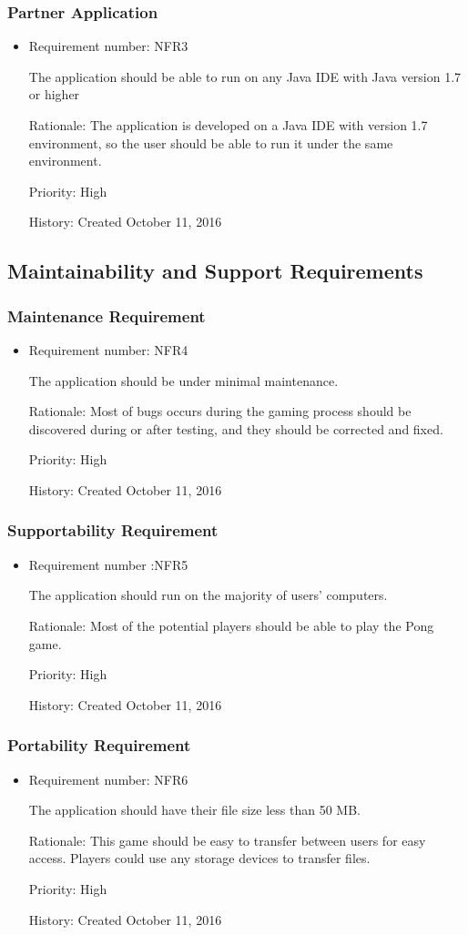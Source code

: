 \documentclass[12pt,letterpaper]{article}
\begin{document}
\subsubsection{Partner Application}
\begin{itemize}
	\item Requirement number: NFR3

	The application should be able to run on any Java IDE with Java version 1.7 or higher

	Rationale: The application is developed on a Java IDE with version 1.7 environment, so the user should be able to run it under the same environment. 

	Priority: High

	History: Created October 11, 2016
\end{itemize}
\subsection{Maintainability and Support Requirements}
\subsubsection{Maintenance Requirement}
\begin{itemize}
	\item Requirement number: NFR4

	The application should be under minimal maintenance.

	Rationale: Most of bugs occurs during the gaming process should be discovered during or after testing, and they should be corrected and fixed.

	Priority: High

	History: Created October 11, 2016
\end{itemize}
\subsubsection{Supportability Requirement}
\begin{itemize}
	\item Requirement number :NFR5
	
	 The application should run on the majority of users’ computers.

	Rationale: Most of the potential players should be able to play the Pong game. 
	
	Priority: High    

	History: Created October 11, 2016    
\end{itemize}
\subsubsection{Portability Requirement}
\begin{itemize}
	\item Requirement number: NFR6

	The application should have their file size less than 50 MB.

	Rationale: This game should be easy to transfer between users for easy access. Players could use any storage devices to transfer files.

	Priority: High

	History: Created October 11, 2016
\end{itemize}
\end{document}
